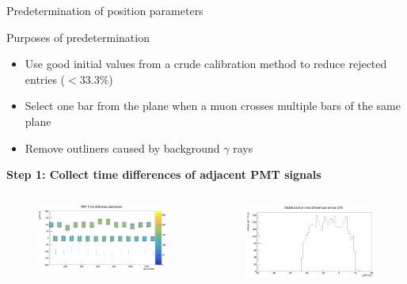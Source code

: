 \documentclass{ikpKoeln}
\begin{document}
\begin{frame}[t]{Predetermination of position parameters}
	\vspace*{-0.5em}
	\begin{exampleblock}{Purposes of predetermination}
		\begin{itemize}
			\item Use good initial values from a crude calibration method to reduce rejected entries ($< 33.3\%$)
			\item Select one bar from the plane when a muon crosses multiple bars of the same plane
			\item Remove outliners caused by background $\gamma$ rays
		\end{itemize}
	\end{exampleblock}
	\textbf{\footnotesize Step 1: Collect time differences of adjacent PMT signals}
	\vspace*{-1.8em}
	\begin{columns}[t]
		\begin{column}[t]{0.48\textwidth}
			\begin{figure}[t]
				\vspace*{-1em}
				\centering
				\includegraphics[height = 0.47\textheight]{R3BCon2024GSI/total_tdiff.png}
			\end{figure}
		\end{column}
		\begin{column}[t]{0.48\textwidth}
			\begin{figure}[t]
				\centering
				\includegraphics[height = 0.48\textheight]{R3BCon2024GSI/one_bar_tdiff.png}
			\end{figure}
		\end{column}
	\end{columns}
\end{frame}
\end{document}
